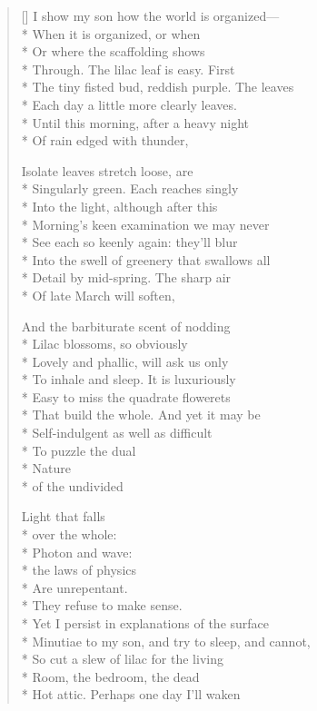 \label{ch:physics_lesson}
\settowidth{\versewidth}{Sense or logic, at least of any kind that might apply}
\begin{verse}[\versewidth]
I show my son how the world is organized---\\*
When it is organized, or when\\*
Or where the scaffolding shows\\*
Through. The lilac leaf is easy.  First\\*
The tiny fisted bud, reddish purple.  The leaves\\*
Each day a little more clearly leaves.\\*
Until this morning, after a heavy night\\*
Of rain edged with thunder,

Isolate leaves stretch loose, are\\*
Singularly green. Each reaches singly\\*
Into the light, although after this\\*
Morning's keen examination we may never\\*
See each so keenly again: they'll blur\\*
Into the swell of greenery that swallows all\\*
Detail by mid-spring.  The sharp air\\*
Of late March will soften,

And the barbiturate scent of nodding\\*
Lilac blossoms, so obviously \\*
Lovely and phallic, will ask us only\\*
To inhale and sleep.  It is luxuriously\\*
Easy to miss the quadrate flowerets\\*
That build the whole.  And yet it may be\\*
Self-indulgent as well as difficult\\*
To puzzle the dual\\*
 \qquad  \qquad  \qquad Nature\\*
 \qquad  \qquad  \qquad  \qquad of the undivided

Light that falls\\*
 \qquad  \qquad over the whole:\\*
Photon and wave:\\*
 \qquad  \qquad     the laws of physics\\*
Are unrepentant.\\*
 \qquad  \qquad     They refuse to make sense.\\*
Yet I persist in explanations of the surface\\*
Minutiae to my son, and try to sleep, and cannot,\\*
So cut a slew of lilac for the living\\*
Room, the bedroom, the dead\\*
Hot attic.  Perhaps one day I'll waken


\end{verse}
